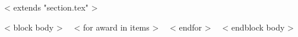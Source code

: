 ~< extends "section.tex" >~

~< block body >~
~< for award in items >~
~< endfor >~
~< endblock body >~
